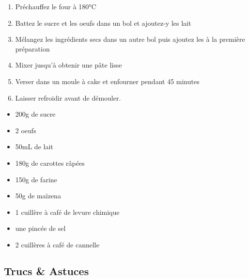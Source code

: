     \begin{minipage}{.7\textwidth}
        \begin{enumerate}
            \item Préchauffez le four à 180°C
	    \item Battez le sucre et les oeufs dans un bol et ajoutez-y les lait
	    \item Mélangez les ingrédients secs dans un autre bol puis ajoutez les à la première préparation
	    \item Mixer jusqu'à obtenir une pâte lisse
	    \item Verser dans un moule à cake et enfourner pendant 45 minutes
	    \item Laisser refroidir avant de démouler.

        \end{enumerate}
    \end{minipage}
    \begin{minipage}{.3\textwidth}
        \begin{flushleft}
        \begin{itemize}
            \item 200g de sucre
	    \item 2 oeufs
	    \item 50mL de lait
	    \item 180g de carottes râpées
	    \item 150g de farine
	    \item 50g de maïzena
	    \item 1 cuillère à café de levure chimique
	    \item une pincée de sel
	    \item 2 cuillères à café de cannelle

        \end{itemize}
        \end{flushleft}
    \end{minipage}
    
    \vspace{1cm}
    \hline
    \vspace{1cm}
    
    \subsection{Trucs \& Astuces}
        
